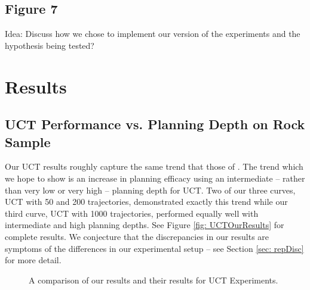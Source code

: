 \documentclass[11pt,twocolumn]{article}
\begin{document}
\subsection{Figure 7}

Idea: Discuss how we chose to implement our version of the experiments and the hypothesis being tested?

\section{Results}


\subsection{UCT Performance vs. Planning Depth on Rock Sample}
Our UCT results roughly capture the same trend that those of \cite{jiang2015dependence}. The trend which we hope to show is an increase in planning efficacy using an intermediate -- rather than very low or very high -- planning depth for UCT. Two of our three curves, UCT with 50 and 200 trajectories, demonstrated exactly this trend while our third curve, UCT with 1000 trajectories, performed equally well with intermediate and high planning depths. See Figure \ref{fig: UCTOurResults} for complete results. We conjecture that the discrepancies in our results are symptoms of the differences in our experimental setup -- see Section \ref{sec: repDisc} for more detail.

\begin{figure}[h]
\centering
{}
\hspace{1mm}
\caption{A comparison of our results and their results for UCT Experiments.}
\end{figure}
\end{document}
